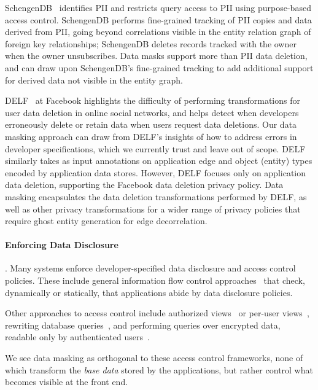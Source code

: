 SchengenDB~\cite{schengendb} identifies PII and restricts query access to PII using purpose-based
access control. SchengenDB performs fine-grained tracking of PII copies and data derived from PII,
going beyond correlations visible in the entity relation graph of foreign key relationships;
SchengenDB deletes records tracked with the owner when the owner unsubscribes.  Data masks support
more than PII data deletion, and can draw upon SchengenDB's fine-grained tracking to add additional
support for derived data not visible in the entity graph. 


DELF~\cite{delf} at Facebook highlights the difficulty of performing transformations for user data
deletion in online social networks, and helps detect when developers erroneously delete or retain
data when users request data deletions.
Our data masking approach can draw from DELF's insights of how to address errors in developer
specifications, which we currently trust and leave out of scope. 
%
DELF similarly takes as input annotations on application edge and object (entity) types encoded by
application data stores. However, DELF focuses only on application
data deletion, \ie supporting the Facebook data deletion privacy policy.
Data masking encapsulates the data deletion transformations performed by DELF, as well as other
privacy transformations for a wider range of privacy policies that require \eg ghost entity
generation for edge decorrelation.


\paragraph{Enforcing Data Disclosure}.
Many systems enforce developer-specified data disclosure and access control policies. These include
general information flow control approaches~\cite{static, jeeves, jif, hails, ifdb} that check, dynamically
or statically, that applications abide by data disclosure policies.

Other approaches to access control include authorized views~\cite{oracle} or per-user
views~\cite{multiverse}, rewriting database queries~\cite{qapla, sieve}, and performing
queries over encrypted data, readable only by authenticated users~\cite{cryptdb}.

We see data masking as orthogonal to these access control frameworks, none of which transform the
\emph{base data} stored by the applications, but rather control what becomes visible at the front
end. 

